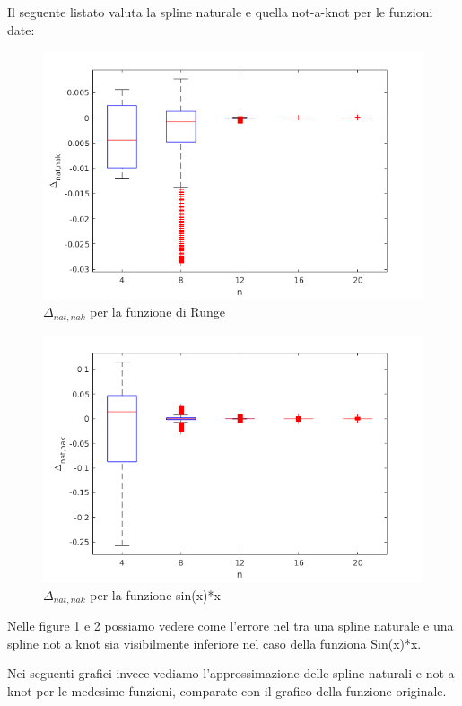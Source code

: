  Il seguente listato valuta la spline naturale e quella not-a-knot per le funzioni date:


\begin{figure}
\centering
\includegraphics[scale=0.7]{cap_4/es5/errors}
\caption{$\Delta_{nat, nak}$ per la funzione di Runge}
\label{err_runge}
\end{figure}
\begin{figure}
\centering
\includegraphics[scale=0.5]{cap_4/es5/errors_sin}
\caption{$\Delta_{nat, nak}$ per la funzione sin(x)*x}
\label{err_sin}
\end{figure}
Nelle figure \ref{err_runge} e \ref{err_sin} possiamo vedere come l'errore nel tra una spline naturale e una spline not a knot sia visibilmente inferiore nel caso della funziona Sin(x)*x.

Nei seguenti grafici invece vediamo l'approssimazione delle spline naturali e not a knot per le medesime funzioni, comparate con il grafico della funzione originale.

